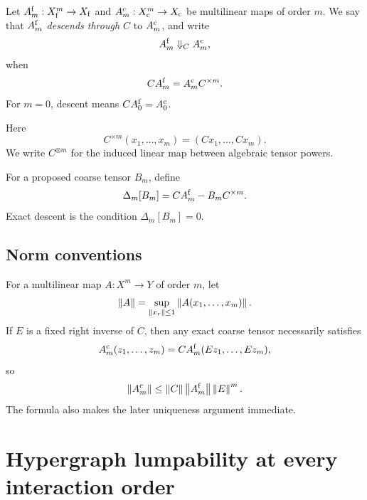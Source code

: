 \begin{PRIQdefinition}\label{PRIQ:def:exact-interaction-quotient}
Let $A_m^{\mathrm f}:X_{\mathrm f}^m\to X_{\mathrm f}$ and $A_m^{\mathrm c}:X_{\mathrm c}^m\to X_{\mathrm c}$ be multilinear maps of order $m$.  We say that $A_m^{\mathrm f}$ \emph{descends through $C$} to $A_m^{\mathrm c}$, and write
\[
  A_m^{\mathrm f}\Downarrow_C A_m^{\mathrm c},
\]
when
\begin{equation}\label{PRIQ:eq:exact-interaction-quotient}
  C A_m^{\mathrm f}
  =
  A_m^{\mathrm c}C^{\times m}.
\end{equation}
For $m=0$, descent means $CA_0^{\mathrm f}=A_0^{\mathrm c}$.
\end{PRIQdefinition}

Here
\[
  C^{\times m}(x_1,\ldots,x_m)
  =(Cx_1,\ldots,Cx_m).
\]
We write $C^{\otimes m}$ for the induced linear map between algebraic tensor powers.

\begin{PRIQdefinition}\label{PRIQ:def:interaction-defect}
For a proposed coarse tensor $B_m$, define
\begin{equation}\label{PRIQ:eq:interaction-defect}
  \Delta_m[B_m]
  =
  CA_m^{\mathrm f}-B_mC^{\times m}.
\end{equation}
Exact descent is the condition $\Delta_m[B_m]=0$.
\end{PRIQdefinition}

\subsection{Norm conventions}
For a multilinear map $A:X^m\to Y$ of order $m$, let
\[
  \left\lVert A\right\rVert
  =
  \sup_{\left\lVert x_r\right\rVert\leq1}
  \left\lVert A(x_1,\ldots,x_m)\right\rVert.
\]
If $E$ is a fixed right inverse of $C$, then any exact coarse tensor necessarily satisfies
\begin{equation}\label{PRIQ:eq:coarse-tensor-bound-preview}
  A_m^{\mathrm c}(z_1,\ldots,z_m)
  =
  CA_m^{\mathrm f}(Ez_1,\ldots,Ez_m),
\end{equation}
so
\[
  \left\lVert A_m^{\mathrm c}\right\rVert
  \leq
  \left\lVert C\right\rVert\left\lVert A_m^{\mathrm f}\right\rVert\left\lVert E\right\rVert^m.
\]
The formula also makes the later uniqueness argument immediate.

\section{Hypergraph lumpability at every interaction order}\label{PRIQ:sec:allarity}

